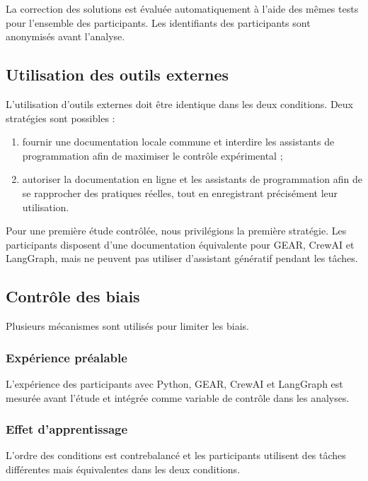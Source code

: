 La correction des solutions est évaluée automatiquement à l'aide des
mêmes tests pour l'ensemble des participants. Les identifiants des
participants sont anonymisés avant l'analyse.


\subsection{Utilisation des outils externes}
\label{subsec:outils-externes}

L'utilisation d'outils externes doit être identique dans les deux
conditions. Deux stratégies sont possibles :

\begin{enumerate}
    \item fournir une documentation locale commune et interdire les
    assistants de programmation afin de maximiser le contrôle
    expérimental ;

    \item autoriser la documentation en ligne et les assistants de
    programmation afin de se rapprocher des pratiques réelles, tout en
    enregistrant précisément leur utilisation.
\end{enumerate}

Pour une première étude contrôlée, nous privilégions la première
stratégie. Les participants disposent d'une documentation équivalente
pour GEAR, CrewAI et LangGraph, mais ne peuvent pas utiliser
d'assistant génératif pendant les tâches.


\subsection{Contrôle des biais}
\label{subsec:controle-biais}

Plusieurs mécanismes sont utilisés pour limiter les biais.


\subsubsection{Expérience préalable}

L'expérience des participants avec Python, GEAR, CrewAI et LangGraph est
mesurée avant l'étude et intégrée comme variable de contrôle dans les
analyses.


\subsubsection{Effet d'apprentissage}

L'ordre des conditions est contrebalancé et les participants utilisent
des tâches différentes mais équivalentes dans les deux conditions.


